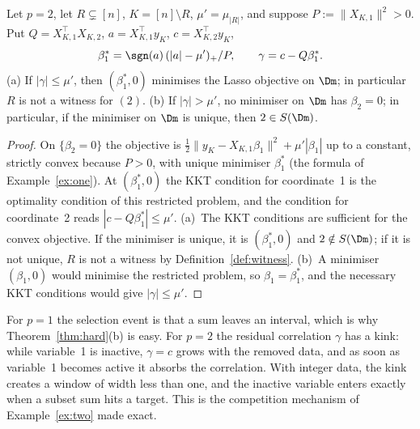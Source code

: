 
\begin{lemma}[Entry criterion for $p=2$]\label{lem:entry}
Let $p=2$, let $R\subsetneq[n]$, $K=[n]\setminus R$, $\mu'=\mu_{|R|}$, and suppose $P:=\lVert X_{K,1}\rVert^2>0$. Put $Q=X_{K,1}^{\top}X_{K,2}$, $a=X_{K,1}^{\top}y_K$, $c=X_{K,2}^{\top}y_K$,
\[
\beta_1^\ast=\sgn(a)\,(|a|-\mu')_+/P,\qquad \gamma=c-Q\beta_1^\ast .
\]
(a) If $|\gamma|\le\mu'$, then $(\beta_1^\ast,0)$ minimises the Lasso objective on $\Dm$; in particular $R$ is not a witness for $(2)$.
(b) If $|\gamma|>\mu'$, no minimiser on $\Dm$ has $\beta_2=0$; in particular, if the minimiser on $\Dm$ is unique, then $2\in S(\Dm)$.
\end{lemma}
\begin{proof}
On $\{\beta_2=0\}$ the objective is $\tfrac12\lVert y_K-X_{K,1}\beta_1\rVert^2+\mu'|\beta_1|$ up to a constant, strictly convex because $P>0$, with unique minimiser $\beta_1^\ast$ (the formula of Example~\ref{ex:one}). At $(\beta_1^\ast,0)$ the KKT condition for coordinate~1 is the optimality condition of this restricted problem, and the condition for coordinate~2 reads $|c-Q\beta_1^\ast|\le\mu'$. (a)~The KKT conditions are sufficient for the convex objective. If the minimiser is unique, it is $(\beta_1^\ast,0)$ and $2\notin S(\Dm)$; if it is not unique, $R$ is not a witness by Definition~\ref{def:witness}. (b)~A minimiser $(\beta_1,0)$ would minimise the restricted problem, so $\beta_1=\beta_1^\ast$, and the necessary KKT conditions would give $|\gamma|\le\mu'$.
\end{proof}

For $p=1$ the selection event is that a sum leaves an interval, which is why Theorem~\ref{thm:hard}(b) is easy. For $p=2$ the residual correlation $\gamma$ has a kink: while variable~1 is inactive, $\gamma=c$ grows with the removed data, and as soon as variable~1 becomes active it absorbs the correlation. With integer data, the kink creates a window of width less than one, and the inactive variable enters exactly when a subset sum hits a target. This is the competition mechanism of Example~\ref{ex:two} made exact.


